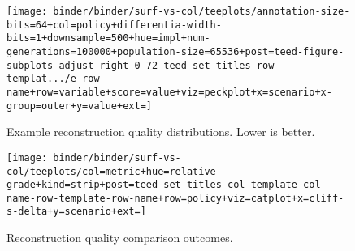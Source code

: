 \begin{figure*}
  \centering
  \begin{subfigure}[b]{0.5\textwidth}
    \centering
    \texttt{[image: binder/binder/surf-vs-col/teeplots/annotation-size-bits=64+col=policy+differentia-width-bits=1+downsample=500+hue=impl+num-generations=100000+population-size=65536+post=teed-figure-subplots-adjust-right-0-72-teed-set-titles-row-templat.../e-row-name+row=variable+score=value+viz=peckplot+x=scenario+x-group=outer+y=value+ext=]}
    \caption{Example reconstruction quality distributions. Lower is better.}
    \label{fig:col-vs-surf-example}
  \end{subfigure}%
  \begin{subfigure}[b]{0.5\textwidth}
    \centering
    \texttt{[image: binder/binder/surf-vs-col/teeplots/col=metric+hue=relative-grade+kind=strip+post=teed-set-titles-col-template-col-name-row-template-row-name+row=policy+viz=catplot+x=cliff-s-delta+y=scenario+ext=]}
    \caption{Reconstruction quality comparison outcomes.}
  \label{fig:col-vs-surf-overview}
  \end{subfigure}
  \caption{%
    \textbf{Does column- or surface-based instrumentation give higher-quality reconstruction?}
    Subpanel \ref{fig:col-vs-surf-overview} shows effect sizes of column-vs-surface comparisons for triplet distance and inner node loss metrics across sensitivity analysis conditions.
    Color coding indicates a significant outcome (Mann-Whitney U).
    Surface tends to outperform column under tilted policy and vice versa under steady policy.
    Subpanel \ref{fig:col-vs-surf-example} shows reconstruction quality effects for 64-bit size, bit-differentia annotations with population size 65,536, downsample size 500, and 100k generations.
    Background hatching indicates significant outcome.
    See Supplementary Figure \ref{fig:col-vs-surf} for listing of effects by sensitivity analysis condition.
  }
  \label{fig:col-vs-surf-summary}
\end{figure*}
